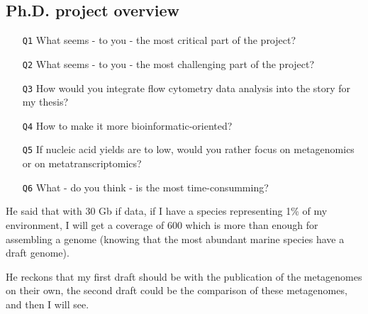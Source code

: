 \subsection{Ph.D. project overview}
\label{task:20180209_cj0}

\begin{itemize}
\item[\texttt{Q1}] What seems - to you - the most critical part of the project?
\item[\texttt{Q2}] What seems - to you - the most challenging part of the project?
\item[\texttt{Q3}] How would you integrate flow cytometry data analysis into the story for my thesis?
\item[\texttt{Q4}] How to make it more bioinformatic-oriented?
\item[\texttt{Q5}] If nucleic acid yields are to low, would you rather focus on metagenomics or on metatranscriptomics?
\item[\texttt{Q6}] What - do you think - is the most time-consumming?
\end{itemize}


He said that with 30 Gb if data, if I have a species representing 1\% of my environment, I will get a coverage of 600 which is more than enough for assembling a genome (knowing that the most abundant marine species have a draft genome).

He reckons that my first draft should be with the publication of the metagenomes on their own, the second draft could be the comparison of these metagenomes, and then I will see.